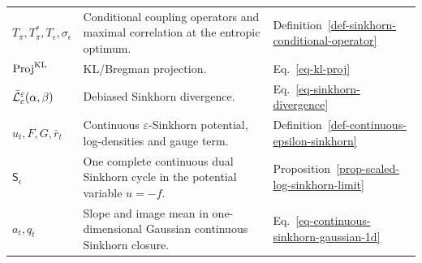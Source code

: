 {\begin{longtable}{>{\raggedright\arraybackslash}p{}
                  >{\raggedright\arraybackslash}p{}
                  >{\raggedright\arraybackslash}p{}}
$T_\pi,T_\pi^*,T_\epsilon,\sigma_\epsilon$ & Conditional coupling operators and maximal correlation at the entropic optimum. & Definition~\ref{def-sinkhorn-conditional-operator} \\
$\operatorname{Proj}^{\mathrm{KL}}$ & KL/Bregman projection. & Eq.~\eqref{eq-kl-proj} \\
$\bar{\mathcal{L}}_c^\varepsilon(\alpha,\beta)$ & Debiased Sinkhorn divergence. & Eq.~\eqref{eq-sinkhorn-divergence} \\
$u_t,F,G,\bar r_t$ & Continuous $\varepsilon$-Sinkhorn potential, log-densities and gauge term. & Definition~\ref{def-continuous-epsilon-sinkhorn} \\
$\mathsf S_\epsilon$ & One complete continuous dual Sinkhorn cycle in the potential variable $u=-f$. & Proposition~\ref{prop-scaled-log-sinkhorn-limit} \\
$a_t,q_t$ & Slope and image mean in one-dimensional Gaussian continuous Sinkhorn closure. & Eq.~\eqref{eq-continuous-sinkhorn-gaussian-1d} \\


\end{longtable}}
